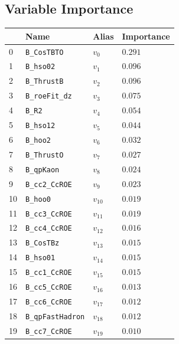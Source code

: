 \subsection{Variable Importance}

\begin{longtable}{| p{} | p{} | p{} |p{} |}
\hline
& Name & Alias & Importance \\ \hline
0 &\texttt{\footnotesize B\_CosTBTO} & $v_{0}$ & $0.291$ \\ \hline
1 &\texttt{\footnotesize B\_hso02} & $v_{1}$ & $0.096$ \\ \hline
2 &\texttt{\footnotesize B\_ThrustB} & $v_{2}$ & $0.096$ \\ \hline
3 &\texttt{\footnotesize B\_roeFit\_dz} & $v_{3}$ & $0.075$ \\ \hline
4 &\texttt{\footnotesize B\_R2} & $v_{4}$ & $0.054$ \\ \hline
5 &\texttt{\footnotesize B\_hso12} & $v_{5}$ & $0.044$ \\ \hline
6 &\texttt{\footnotesize B\_hoo2} & $v_{6}$ & $0.032$ \\ \hline
7 &\texttt{\footnotesize B\_ThrustO} & $v_{7}$ & $0.027$ \\ \hline
8 &\texttt{\footnotesize B\_qpKaon} & $v_{8}$ & $0.024$ \\ \hline
9 &\texttt{\footnotesize B\_cc2\_CcROE} & $v_{9}$ & $0.023$ \\ \hline
10 &\texttt{\footnotesize B\_hoo0} & $v_{10}$ & $0.019$ \\ \hline
11 &\texttt{\footnotesize B\_cc3\_CcROE} & $v_{11}$ & $0.019$ \\ \hline
12 &\texttt{\footnotesize B\_cc4\_CcROE} & $v_{12}$ & $0.016$ \\ \hline
13 &\texttt{\footnotesize B\_CosTBz} & $v_{13}$ & $0.015$ \\ \hline
14 &\texttt{\footnotesize B\_hso01} & $v_{14}$ & $0.015$ \\ \hline
15 &\texttt{\footnotesize B\_cc1\_CcROE} & $v_{15}$ & $0.015$ \\ \hline
16 &\texttt{\footnotesize B\_cc5\_CcROE} & $v_{16}$ & $0.013$ \\ \hline
17 &\texttt{\footnotesize B\_cc6\_CcROE} & $v_{17}$ & $0.012$ \\ \hline
18 &\texttt{\footnotesize B\_qpFastHadron} & $v_{18}$ & $0.012$ \\ \hline
19 &\texttt{\footnotesize B\_cc7\_CcROE} & $v_{19}$ & $0.010$ \\ \hline

\end{longtable}

